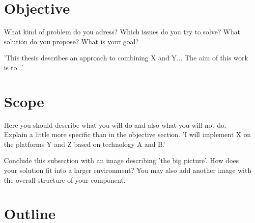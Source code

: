 \section{Objective\label{sec:objective}}

What kind of problem do you adress? Which issues do you try to solve? What solution do you
propose? What is your goal?

'This thesis describes an approach to combining X and Y... The aim of this work is to...'

\section{Scope\label{sec:scope}}

Here you should describe what you will do and also what you will not do. Explain a little
more specific than in the objective section. 'I will implement X on the platforms Y and Z
based on technology A and B.'

Conclude this subsection with an image describing 'the big picture'. How does your solution
fit into a larger environment? You may also add another image with the overall structure of
your component.

\section{Outline\label{sec:outline}}

